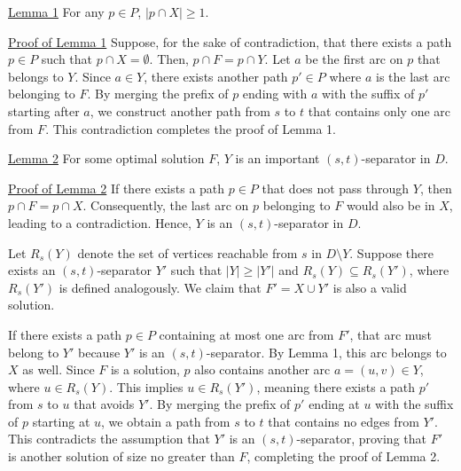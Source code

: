 \documentclass[12pt]{article}
\begin{document}
	\medskip
	
	\underline{Lemma 1} For any \(p \in P\), \(|p \cap X| \geqslant 1\).
	
	\medskip
	
	\underline{Proof of Lemma 1} Suppose, for the sake of contradiction, that
	there exists a path \(p \in P\) such that \(p \cap X = \emptyset\). Then,
	\(p \cap F = p \cap Y\). Let \(a\) be the first arc on \(p\) that belongs to
	\(Y\). Since \(a \in Y\), there exists another path \(p' \in P\) where \(a\)
	is the last arc belonging to \(F\). By merging the prefix of \(p\) ending
	with \(a\) with the suffix of \(p'\) starting after \(a\), we construct
	another path from \(s\) to \(t\) that contains only one arc from \(F\). This
	contradiction completes the proof of Lemma 1.
	
	\medskip
	
	\underline{Lemma 2} For some optimal solution \(F\), \(Y\) is an important
	\((s, t)\)-separator in \(D\).
	
	\medskip
	
	\underline{Proof of Lemma 2} If there exists a path \(p \in P\) that does
	not pass through \(Y\), then \(p \cap F = p \cap X\). Consequently, the last
	arc on \(p\) belonging to \(F\) would also be in \(X\), leading to a
	contradiction. Hence, \(Y\) is an \((s, t)\)-separator in \(D\).
	
	\smallskip
	
	Let \(R_{s}(Y)\) denote the set of vertices reachable from \(s\) in \(D
	\setminus Y\). Suppose there exists an \((s, t)\)-separator \(Y'\) such that
	\(|Y| \geqslant |Y'|\) and \(R_{s}(Y) \subseteq R_{s}(Y')\), where
	\(R_{s}(Y')\) is defined analogously. We claim that \(F' = X \cup Y'\) is
	also a valid solution.
	
	\smallskip
	
	If there exists a path \(p \in P\) containing at most one arc from \(F'\),
	that arc must belong to \(Y'\) because \(Y'\) is an \((s, t)\)-separator.
	By Lemma 1, this arc belongs to \(X\) as well. Since \(F\) is a solution,
	\(p\) also contains another arc \(a = (u, v) \in Y\), where \(u \in
	R_{s}(Y)\). This implies \(u \in R_{s}(Y')\), meaning there exists a path
	\(p'\) from \(s\) to \(u\) that avoids \(Y'\). By merging the prefix of
	\(p'\) ending at \(u\) with the suffix of \(p\) starting at \(u\), we obtain
	a path from \(s\) to \(t\) that contains no edges from \(Y'\). This
	contradicts the assumption that \(Y'\) is an \((s, t)\)-separator, proving
	that \(F'\) is another solution of size no greater than \(F\), completing
	the proof of Lemma 2.
	
\end{document}
